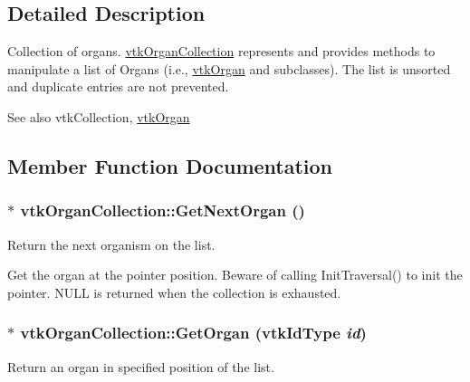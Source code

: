 \subsection{Detailed Description}
Collection of organs. \hyperlink{classvtkOrganCollection}{vtkOrganCollection} represents and provides methods to manipulate a list of Organs (i.e., \hyperlink{classvtkOrgan}{vtkOrgan} and subclasses). The list is unsorted and duplicate entries are not prevented. \begin{DoxySeeAlso}{See also}
vtkCollection, \hyperlink{classvtkOrgan}{vtkOrgan} 
\end{DoxySeeAlso}


\subsection{Member Function Documentation}
\hypertarget{classvtkOrganCollection_a6c938a8313d037d6f3298b535c09381d}{
\subsubsection[{GetNextOrgan}]{ $\ast$ vtkOrganCollection::GetNextOrgan ()}}
\label{classvtkOrganCollection_a6c938a8313d037d6f3298b535c09381d}


Return the next organism on the list. 

Get the organ at the pointer position. Beware of calling InitTraversal() to init the pointer. NULL is returned when the collection is exhausted. \hypertarget{classvtkOrganCollection_aa5257cc112516992a222c4cdf4e72003}{
\subsubsection[{GetOrgan}]{ $\ast$ vtkOrganCollection::GetOrgan (vtkIdType {\em id})}}
\label{classvtkOrganCollection_aa5257cc112516992a222c4cdf4e72003}


Return an organ in specified position of the list. 

